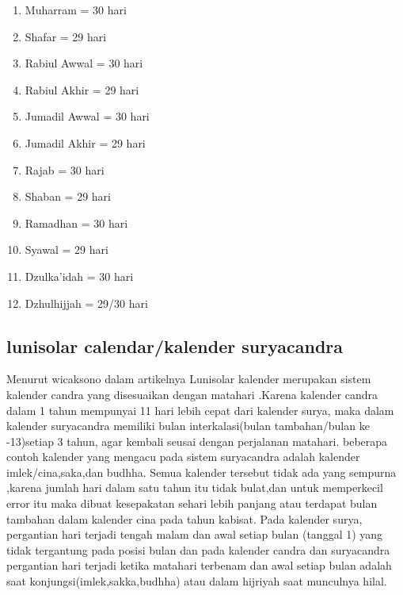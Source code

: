     \begin{enumerate}
        \item Muharram      = 30 hari
        \item Shafar        = 29 hari
        \item Rabiul Awwal  = 30 hari
        \item Rabiul Akhir  = 29 hari
        \item Jumadil Awwal = 30 hari
        \item Jumadil Akhir = 29 hari
        \item Rajab         = 30 hari
        \item Shaban        = 29 hari
        \item Ramadhan      = 30 hari
        \item Syawal        = 29 hari
        \item Dzulka'idah   = 30 hari
        \item Dzhulhijjah   = 29/30 hari
    \end{enumerate}

  \subsection{lunisolar calendar/kalender suryacandra}
      Menurut wicaksono dalam artikelnya Lunisolar kalender merupakan sistem kalender candra yang disesuaikan dengan matahari \cite{wicaksono2008ta}.Karena kalender candra dalam 1 tahun mempunyai 11 hari lebih cepat dari kalender surya, maka dalam kalender suryacandra memiliki bulan interkalasi(bulan tambahan/bulan ke -13)setiap 3 tahun, agar kembali seusai dengan perjalanan matahari.
    beberapa contoh kalender yang mengacu pada sistem suryacandra adalah kalender imlek/cina,saka,dan budhha. Semua kalender tersebut tidak ada yang sempurna ,karena jumlah hari dalam satu tahun itu tidak bulat,dan untuk memperkecil error itu maka dibuat kesepakatan sehari lebih panjang atau terdapat bulan tambahan dalam kalender cina pada tahun kabisat\cite{wicaksono2008ta}.
    Pada kalender surya, pergantian hari terjadi tengah malam dan awal setiap bulan (tanggal 1) yang tidak tergantung pada posisi bulan dan pada kalender candra dan suryacandra pergantian hari terjadi ketika matahari terbenam dan awal setiap bulan adalah saat konjungsi(imlek,sakka,budhha) atau dalam hijriyah saat munculnya hilal.
